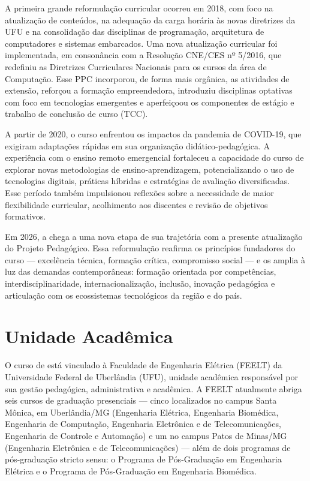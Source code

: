A primeira grande reformulação curricular ocorreu em 2018, com foco na atualização de conteúdos, na adequação da carga horária às novas diretrizes da UFU e na consolidação das disciplinas de programação, arquitetura de computadores e sistemas embarcados. Uma nova atualização curricular foi implementada, em consonância com a Resolução CNE/CES nº 5/2016, que redefiniu as Diretrizes Curriculares Nacionais para os cursos da área de Computação. Esse PPC incorporou, de forma mais orgânica, as atividades de extensão, reforçou a formação empreendedora, introduziu disciplinas optativas com foco em tecnologias emergentes e aperfeiçoou os componentes de estágio e trabalho de conclusão de curso (TCC).

A partir de 2020, o curso enfrentou os impactos da pandemia de COVID-19, que exigiram adaptações rápidas em sua organização didático-pedagógica. A experiência com o ensino remoto emergencial fortaleceu a capacidade do curso de explorar novas metodologias de ensino-aprendizagem, potencializando o uso de tecnologias digitais, práticas híbridas e estratégias de avaliação diversificadas. Esse período também impulsionou reflexões sobre a necessidade de maior flexibilidade curricular, acolhimento aos discentes e revisão de objetivos formativos.

Em 2026, a \nomecursonovo chega a uma nova etapa de sua trajetória com a presente atualização do Projeto Pedagógico. Essa reformulação reafirma os princípios fundadores do curso — excelência técnica, formação crítica, compromisso social — e os amplia à luz das demandas contemporâneas: formação orientada por competências, interdisciplinaridade, internacionalização, inclusão, inovação pedagógica e articulação com os ecossistemas tecnológicos da região e do país.

\section{Unidade Acadêmica}

O curso de \nomecursonovo está vinculado à Faculdade de Engenharia Elétrica (FEELT) da Universidade Federal de Uberlândia (UFU), unidade acadêmica responsável por sua gestão pedagógica, administrativa e acadêmica. A FEELT atualmente abriga seis cursos de graduação presenciais — cinco localizados no campus Santa Mônica, em Uberlândia/MG (Engenharia Elétrica, Engenharia Biomédica, Engenharia de Computação, Engenharia Eletrônica e de Telecomunicações, Engenharia de Controle e Automação) e um no campus Patos de Minas/MG (Engenharia Eletrônica e de Telecomunicações) — além de dois programas de pós-graduação stricto sensu: o Programa de Pós-Graduação em Engenharia Elétrica e o Programa de Pós-Graduação em Engenharia Biomédica.

